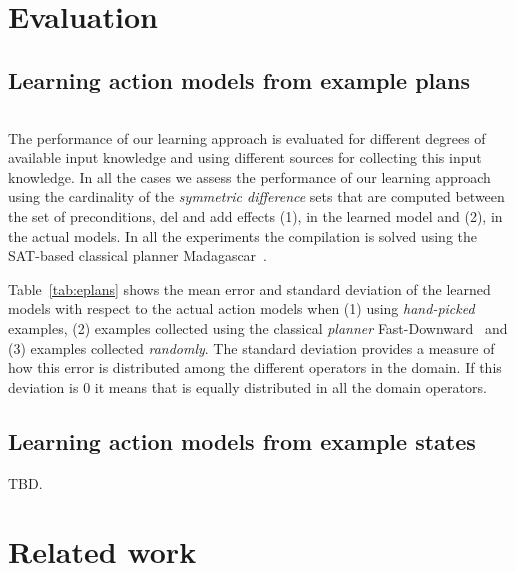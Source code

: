 \documentclass[letterpaper]{article} %
\begin{document}
\section{Evaluation}

\subsection{Learning action models from example plans}
\begin{table*}[!hbt]
\begin{footnotesize}
\begin{tabular}{l||c|c|c||c|c|c||c|c|c}


\end{tabular}
\end{footnotesize}
\caption{\small Mean error and standard deviation of the learned models when using hand-picked examples and examples collected using the classical planner Fast-Downward.}
  \label{tab:eplans}
\end{table*}

The performance of our learning approach is evaluated for different degrees of available input knowledge and using different sources for collecting this input knowledge. In all the cases we assess the performance of our learning approach using the cardinality of the {\em symmetric difference} sets that are computed between the set of preconditions, del and add effects (1), in the learned model and (2), in the actual models. In all the experiments the compilation is solved using the SAT-based classical planner {\sc Madagascar}~\cite{rintanen2014madagascar}.

Table~\ref{tab:eplans} shows the mean error and standard deviation of the learned models with respect to the actual action models when (1) using {\em hand-picked} examples, (2) examples collected using the classical {\em planner} {\sc Fast-Downward}~\cite{helmert2006fast} and (3) examples collected {\em randomly}. The standard deviation provides a measure of how this error is distributed among the different operators in the domain. If this deviation is 0 it means that is equally distributed in all the domain operators.


\subsection{Learning action models from example states}
TBD.


\section{Related work}
\end{document}
